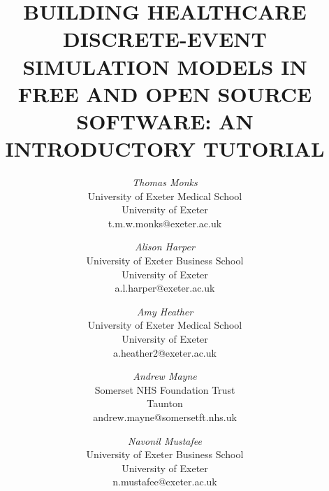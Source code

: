 \documentclass{swpaperproc}
\theoremstyle{sw}
\begin{document}


%
%

\title{BUILDING HEALTHCARE DISCRETE-EVENT SIMULATION MODELS IN FREE AND OPEN SOURCE SOFTWARE: AN INTRODUCTORY TUTORIAL}

\author{\textit{Thomas Monks}\\ [11pt]
University of Exeter Medical School\\
University of Exeter\\
t.m.w.monks@exeter.ac.uk\\
\and
\textit{Alison Harper}\\[11pt]
University of Exeter Business School\\
University of Exeter\\
a.l.harper@exeter.ac.uk\\
\and
\textit{Amy Heather}\\ [11pt]
University of Exeter Medical School\\
University of Exeter\\
a.heather2@exeter.ac.uk\\
\and
\textit{Andrew Mayne}\\ [11pt]
Somerset NHS Foundation Trust\\
Taunton\\
andrew.mayne@somersetft.nhs.uk\\
\and
\textit{Navonil Mustafee}\\[11pt]
University of Exeter Business School\\
University of Exeter\\
n.mustafee@exeter.ac.uk\\
}

\maketitle
\end{document}

